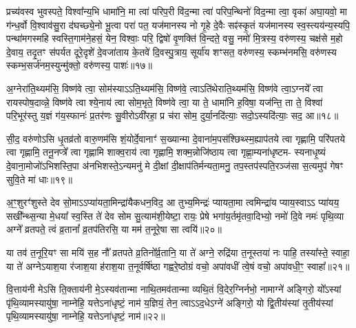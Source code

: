 {\anuvakamend[{हृ॒त्सु पञ्च॑त्रिꣳशच्च॥८॥}]}

प्रच्य॑वस्व भुवस्पते॒ विश्वा᳚न्य॒भि धामा॑नि॒ मा त्वा॑ परिप॒री वि॑द॒न्मा त्वा॑ परिप॒न्थिनो॑ विद॒न्मा त्वा॒ वृका॑ अघा॒यवो॒ मा ग॑न्ध॒र्वो वि॒श्वाव॑सु॒रा द॑घच्छ्ये॒नो भू॒त्वा परा॑ पत॒ यज॑मानस्य नो गृ॒हे दे॒वैः सꣴ॑स्कृ॒तं यज॑मानस्य स्व॒स्त्यय॑न्य॒स्यपि॒ पन्था॑मगस्महि स्वस्ति॒गाम॑ने॒हसं॒ येन॒ विश्वाः॒ परि॒ द्विषो॑ वृ॒णक्ति॑ वि॒न्दते॒ वसु॒ नमो॑ मि॒त्रस्य॒ वरु॑णस्य॒ चक्ष॑से म॒हो दे॒वाय॒ तदृ॒तꣳ स॑पर्यत दूरे॒दृशे॑ दे॒वजा॑ताय के॒तवे॑ दि॒वस्पु॒त्राय॒ सूर्या॑य शꣳसत॒ वरु॑णस्य॒ स्कम्भ॑नमसि॒ वरु॑णस्य स्कम्भ॒सर्ज॑नम॒स्युन्मु॑क्तो॒ वरु॑णस्य॒ पाशः॑॥१७॥

{\anuvakamend[{मि॒त्रस्य॒ त्रयो॑विꣳशतिश्च॥९॥}]}

अ॒ग्नेरा॑ति॒थ्यम॑सि॒ विष्ण॑वे त्वा॒ सोम॑स्या\-ऽ\-ऽति॒थ्यम॑सि॒ विष्ण॑वे॒ त्वा\-ऽति॑थेराति॒थ्यम॑सि॒ विष्ण॑वे त्वा॒\-ऽग्नये᳚ त्वा रायस्पोष॒दाव्न्ने॒ विष्ण॑वे त्वा श्ये॒नाय॑ त्वा सोम॒भृते॒ विष्ण॑वे त्वा॒ या ते॒ धामा॑नि ह॒विषा॒ यज॑न्ति॒ ता ते॒ विश्वा॑ परि॒भूर॑स्तु य॒ज्ञं ग॑य॒स्फानः॑ प्र॒तर॑णः सु॒वीरो\-ऽवी॑रहा॒ प्र च॑रा सोम॒ दुर्या॒नदि॑त्याः॒ सदो॒\-ऽस्यदि॑त्याः॒ सद॒ आ॥१८॥

सी॒द॒ वरु॑णो\-ऽसि धृ॒तव्र॑तो वारु॒णम॑सि शं॒योर्दे॒वानाꣳ॑ स॒ख्यान्मा दे॒वाना॑म॒पस॑श्छिथ्स्म॒ह्याप॑तये त्वा गृह्णामि॒ परि॑पतये त्वा गृह्णामि॒ तनू॒नप्त्रे᳚ त्वा गृह्णामि शाक्व॒राय॑ त्वा गृह्णामि॒ शक्म॒न्नोजि॑ष्ठाय त्वा गृह्णा॒म्यना॑धृष्टम- स्यनाधृ॒ष्यं दे॒वाना॒मोजो॑\-ऽभिशस्ति॒पा अ॑नभिशस्ते॒\-ऽन्यमनु॑ मे दी॒क्षां दी॒क्षाप॑तिर्मन्यता॒मनु॒ तप॒स्तप॑स्पति॒रञ्ज॑सा स॒त्यमुप॑ गेषꣳ सुवि॒ते मा॑ धाः॥१९॥

{\anuvakamend[{आ मैकं॑ च॥10॥}]}

अ॒ꣳ॒शुरꣳ॑शुस्ते देव सो॒मा\-ऽ\-ऽप्या॑यता॒मिन्द्रा॑यैकधन॒विद॒ आ तुभ्य॒मिन्द्रः॑ प्यायता॒मा त्वमिन्द्रा॑य प्याय॒स्वा\-ऽ\-ऽ प्या॑यय॒ सखी᳚न्थ्स॒न्या मे॒धया᳚ स्व॒स्ति ते॑ देव सोम सु॒त्याम॑शी॒येष्टा॒ रायः॒ प्रेषे भगा॑य॒र्तमृ॑तवा॒दिभ्यो॒ नमो॑ दि॒वे नमः॑ पृथि॒व्या अग्ने᳚ व्रतपते॒ त्वं व्र॒तानां᳚ व्र॒तप॑तिरसि॒ या मम॑ त॒नूरे॒षा सा त्वयि॑॥२०॥

या तव॑ त॒नूरि॒यꣳ सा मयि॑ स॒ह नौ᳚ व्रतपते व्र॒तिनो᳚र्व्र॒तानि॒ या ते॑ अग्ने॒ रुद्रि॑या त॒नूस्तया॑ नः पाहि॒ तस्या᳚स्ते॒ स्वाहा॒ या ते॑ अग्ने\-ऽयाश॒या र॑जाश॒या ह॑राश॒या त॒नूर्वर्\mbox{}षि॑ष्ठा गह्वरे॒ष्ठोग्रं वचो॒ अपा॑वधीं त्वे॒षं वचो॒ अपा॑वधी॒ꣳ॒ स्वाहा᳚॥२१॥

{\anuvakamend[{त्वयि॑ चत्वारि॒ꣳ॒शच्च॑॥11॥}]}

वि॒त्ताय॑नी मे\-ऽसि ति॒क्ताय॑नी मे॒\-ऽस्यव॑तान्मा नाथि॒तमव॑तान्मा व्यथि॒तं वि॒देर॒ग्निर्नभो॒ नामाग्ने॑ अङ्गिरो॒ यो᳚\-ऽस्यां पृ॑थि॒व्यामस्यायु॑षा॒ नाम्नेहि॒ यत्ते\-ऽना॑धृष्टं॒ नाम॑ य॒ज्ञियं॒ तेन॒ त्वा\-ऽ\-ऽद॒धे\-ऽग्ने॑ अङ्गिरो॒ यो द्वि॒तीय॑स्यां तृ॒तीय॑स्यां पृथि॒व्यामस्यायु॑षा॒ नाम्नेहि॒ यत्ते\-ऽना॑धृष्टं॒ नाम॑॥२२॥


